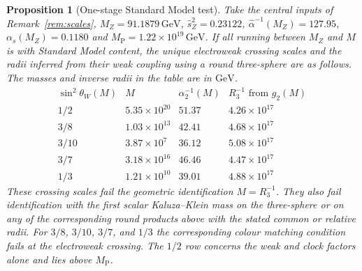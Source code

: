 \documentclass[aps,pra,onecolumn,superscriptaddress,nofootinbib,10pt]{revtex4-2}
\newtheorem{proposition}[theorem]{Proposition}
\theoremstyle{definition}
\theoremstyle{remark}
\begin{document}
\begin{proposition}[One-stage Standard Model test]\label{cr:onestage}
Take the central inputs of Remark~\ref{rem:scales},
$M_Z=91.1879\,\mathrm{GeV}$, $\hat s_Z^2=0.23122$,
$\hat\alpha^{-1}(M_Z)=127.95$, $\alpha_s(M_Z)=0.1180$ and
$M_{\mathrm P}=1.22\times10^{19}\,\mathrm{GeV}$. If all running
between $M_Z$ and $M$ is with Standard Model content, the unique
electroweak crossing scales and the radii inferred from their weak
coupling using a round three-sphere are as follows. The masses and
inverse radii in the table are in $\mathrm{GeV}$.
\[
 \begin{array}{c|r|r|r}
 \sin^2\theta_W(M)&M&\alpha_2^{-1}(M)& R_3^{-1}\text{ from }g_2(M)\\\hline
 1/2 &5.35\times10^{20}&51.37&4.26\times10^{17}\\
 3/8 &1.03\times10^{13}&42.41&4.68\times10^{17}\\
 3/10&3.87\times10^{7} &36.12&5.08\times10^{17}\\
 3/7 &3.18\times10^{16}&46.46&4.47\times10^{17}\\
 1/3 &1.21\times10^{10}&39.01&4.88\times10^{17}
 \end{array}
\]
These crossing scales fail the geometric identification $M=R_3^{-1}$.
They also fail identification with the first scalar Kaluza--Klein
mass on the three-sphere or on any of the corresponding
round products above with the stated common or
relative radii. For $3/8$, $3/10$, $3/7$, and $1/3$ the
corresponding colour matching condition fails at the electroweak
crossing. The $1/2$ row concerns the weak and clock factors alone
and lies above $M_{\mathrm P}$.
\end{proposition}
\end{document}
